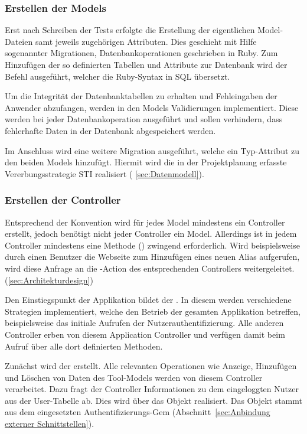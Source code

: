 \subsubsection{Erstellen der Models}
\label{sec:Erstellen der Models}
Erst nach Schreiben der Tests erfolgte die Erstellung der eigentlichen Model-Dateien samt jeweils
zugehörigen Attributen. Dies geschieht mit Hilfe sogenannter Migrationen,
Datenbankoperationen geschrieben in Ruby. Zum Hinzufügen der so definierten Tabellen und Attribute
zur Datenbank wird der Befehl  ausgeführt, welcher die Ruby-Syntax in
\acs{SQL} übersetzt.

Um die Integrität der Datenbanktabellen zu erhalten und \ggfs Fehleingaben der Anwender abzufangen,
werden in den Models Validierungen implementiert. Diese werden bei jeder Datenbankoperation
ausgeführt und sollen verhindern, dass fehlerhafte Daten in der Datenbank abgespeichert werden.


Im Anschluss wird eine weitere Migration ausgeführt, welche ein Typ-Attribut zu den
beiden Models hinzufügt. Hiermit wird die in der
Projektplanung erfasste Vererbungsstrategie \acs{STI} realisiert (\Vgl
\ref{sec:Datenmodell}).

\subsubsection{Erstellen der Controller}
\label{sec:Erstellen der Controller}
Entsprechend der Konvention wird für jedes Model mindestens ein
Controller erstellt, jedoch benötigt nicht jeder Controller ein Model.
Allerdings ist in jedem Controller mindestens eine Methode
() zwingend erforderlich. Wird beispielsweise
durch einen Benutzer die Webseite zum Hinzufügen eines neuen Alias
aufgerufen, wird diese Anfrage an die -Action des
entsprechenden Controllers weitergeleitet.
(\Vgl \ref{sec:Architekturdesign})

Den Einstiegspunkt der Applikation bildet der . In diesem werden
verschiedene Strategien implementiert, welche den Betrieb der gesamten Applikation betreffen,
beispielsweise das initiale Aufrufen der Nutzerauthentifizierung. Alle anderen Controller erben von diesem
Application Controller und verfügen damit beim Aufruf über alle dort definierten Methoden.

Zunächst wird der  erstellt. Alle relevanten Operationen
wie Anzeige, Hinzufügen und Löschen von Daten des Tool-Models werden von diesem Controller
verarbeitet. Dazu fragt der Controller Informationen zu dem eingeloggten Nutzer aus der User-Tabelle
ab. Dies wird über das Objekt  realisiert. Das Objekt stammt aus dem
eingesetzten Authentifizierungs-Gem  (\Vgl Abschnitt~\ref{sec:Anbindung externer Schnittstellen}).

